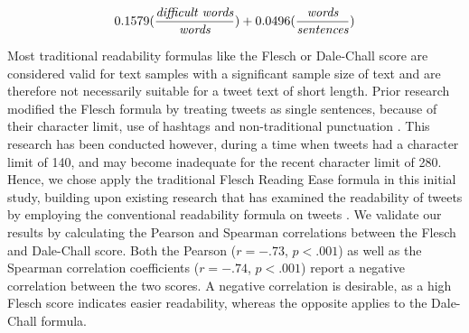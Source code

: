 \documentclass[
10pt, %
a4paper, %
oneside, %
headinclude,footinclude, %
] {book}%
\begin{document}
\[ 0.1579 (\frac{\emph{difficult words}}{\emph{words}}) + 0.0496 (\frac{\emph{words}}{\emph{sentences}}) \]

Most traditional readability formulas like the Flesch or Dale-Chall score are considered valid for text samples with a significant sample size of text and are therefore not necessarily suitable for a tweet text of short length. Prior research modified the Flesch formula by treating tweets as single sentences, because of their character limit, use of hashtags and non-traditional punctuation \citep{collins2014computational}. This research has been conducted however, during a time when tweets had a character limit of 140, and may become inadequate for the recent character limit of 280. Hence, we chose apply the traditional Flesch Reading Ease formula in this initial study, building upon existing research that has examined the readability of tweets by employing the conventional readability formula on tweets \citep{jacob2019readability}. We validate our results by calculating the Pearson and Spearman correlations between the Flesch and Dale-Chall score. Both the Pearson ($r = -.73$, $p<.001$) as well as the Spearman correlation coefficients ($r = -.74$, $p<.001$) report a negative correlation between the two scores. A negative correlation is desirable, as a high Flesch score indicates easier readability, whereas the opposite applies to the Dale-Chall formula. 
\end{document}
